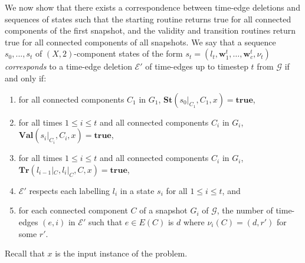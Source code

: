 \documentclass[a4paper,UKenglish,cleveref, autoref, thm-restate]{lipics-v2021} %
\begin{document}
\begin{toappendix}
We now show that there exists a correspondence between time-edge deletions and sequences of states such that the starting routine returns true for all connected components of the first snapshot, and the validity and transition routines return true for all connected components of all snapshots. We say that a sequence $s_0, ..., s_t$ of $(X,2)$-component states of the form $s_t=(l_t,\textbf{w}^t_1,\ldots,\textbf{w}^t_c, \nu_t)$ \textit{corresponds} to a time-edge deletion $\mathcal{E}'$ of time-edges up to timestep $t$ from $\mathcal{G}$ if and only if:
\begin{enumerate}
    \item for all connected components $C_1$ in $G_1$, $\textbf{St}(s_0|_{C_1}, C_1,x)=\textbf{true}$,
    \item for all times $1\leq i\leq t$ and all connected components $C_{i}$ in $G_{i}$, $\textbf{Val}(s_{i}|_{C_{i}}, C_{i},x)=\textbf{true}$,
    \item for all times $1\leq i\leq t$ and all connected components $C_{i}$ in $G_{i}$, $\textbf{Tr}(l_{i-1}|_C, l_i|_C, C,x)=\textbf{true}$, 
    \item $\mathcal{E}'$ respects each labelling $l_i$ in a state $s_i$ for all $1\leq i\leq t$, and
    \item for each connected component $C$ of a snapshot $G_i$ of $\mathcal{G}$, the number of time-edges $(e,i)$ in $\mathcal{E}'$ such that $e\in E(C)$ is $d$ where $\nu_i(C)=(d,r')$ for some $r'$.
\end{enumerate}
Recall that $x$ is the input instance of the problem.


\end{toappendix}
\end{document}
